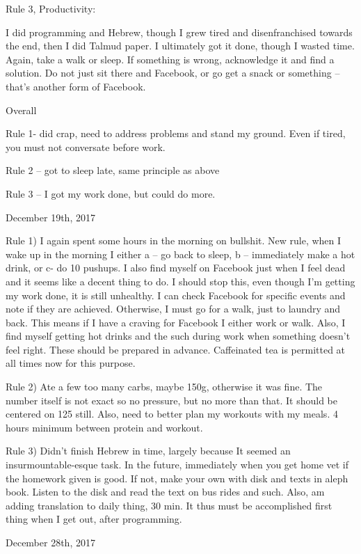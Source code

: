 Rule 3, Productivity:

I did programming and Hebrew, though I grew tired and disenfranchised
towards the end, then I did Talmud paper. I ultimately got it done,
though I wasted time. Again, take a walk or sleep. If something is
wrong, acknowledge it and find a solution. Do not just sit there and
Facebook, or go get a snack or something -- that's another form of
Facebook.

Overall

Rule 1- did crap, need to address problems and stand my ground. Even if
tired, you must not conversate before work.

Rule 2 -- got to sleep late, same principle as above

Rule 3 -- I got my work done, but could do more.

\bigskip
\bigskip
December 19th, 2017

Rule 1) I again spent some hours in the morning on bullshit. New rule,
when I wake up in the morning I either a -- go back to sleep, b --
immediately make a hot drink, or c- do 10 pushups. I also find myself on
Facebook just when I feel dead and it seems like a decent thing to do. I
should stop this, even though I'm getting my work done, it is still
unhealthy. I can check Facebook for specific events and note if they are
achieved. Otherwise, I must go for a walk, just to laundry and back.
This means if I have a craving for Facebook I either work or walk. Also,
I find myself getting hot drinks and the such during work when something
doesn't feel right. These should be prepared in advance. Caffeinated tea
is permitted at all times now for this purpose.

Rule 2) Ate a few too many carbs, maybe 150g, otherwise it was fine. The
number itself is not exact so no pressure, but no more than that. It
should be centered on 125 still. Also, need to better plan my workouts
with my meals. 4 hours minimum between protein and workout.

Rule 3) Didn't finish Hebrew in time, largely because It seemed an
insurmountable-esque task. In the future, immediately when you get home
vet if the homework given is good. If not, make your own with disk and
texts in aleph book. Listen to the disk and read the text on bus rides
and such. Also, am adding translation to daily thing, 30 min. It thus
must be accomplished first thing when I get out, after programming.

\bigskip
\bigskip
December 28th, 2017

